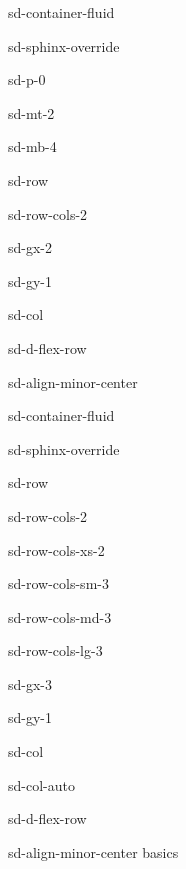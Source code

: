 \documentclass[letterpaper,10pt,english]{jupyterBook}
\begin{document}
\sphinxAtStartPar
{} 

\sphinxAtStartPar
{} 

\sphinxstepscope

\begin{sphinxuseclass}{sd-container-fluid}
\begin{sphinxuseclass}{sd-sphinx-override}
\begin{sphinxuseclass}{sd-p-0}
\begin{sphinxuseclass}{sd-mt-2}
\begin{sphinxuseclass}{sd-mb-4}
\begin{sphinxuseclass}{sd-row}
\begin{sphinxuseclass}{sd-row-cols-2}
\begin{sphinxuseclass}{sd-gx-2}
\begin{sphinxuseclass}{sd-gy-1}
\begin{sphinxuseclass}{sd-col}
\begin{sphinxuseclass}{sd-d-flex-row}
\begin{sphinxuseclass}{sd-align-minor-center}
\begin{sphinxuseclass}{sd-container-fluid}
\begin{sphinxuseclass}{sd-sphinx-override}
\begin{sphinxuseclass}{sd-row}
\begin{sphinxuseclass}{sd-row-cols-2}
\begin{sphinxuseclass}{sd-row-cols-xs-2}
\begin{sphinxuseclass}{sd-row-cols-sm-3}
\begin{sphinxuseclass}{sd-row-cols-md-3}
\begin{sphinxuseclass}{sd-row-cols-lg-3}
\begin{sphinxuseclass}{sd-gx-3}
\begin{sphinxuseclass}{sd-gy-1}
\begin{sphinxuseclass}{sd-col}
\begin{sphinxuseclass}{sd-col-auto}
\begin{sphinxuseclass}{sd-d-flex-row}
\begin{sphinxuseclass}{sd-align-minor-center}
\sphinxAtStartPar
basics


\end{sphinxuseclass}
\end{sphinxuseclass}
\end{sphinxuseclass}
\end{sphinxuseclass}
\end{sphinxuseclass}
\end{sphinxuseclass}
\end{sphinxuseclass}
\end{sphinxuseclass}
\end{sphinxuseclass}
\end{sphinxuseclass}
\end{sphinxuseclass}
\end{sphinxuseclass}
\end{sphinxuseclass}
\end{sphinxuseclass}
\end{sphinxuseclass}
\end{sphinxuseclass}
\end{sphinxuseclass}
\end{sphinxuseclass}
\end{sphinxuseclass}
\end{sphinxuseclass}
\end{sphinxuseclass}
\end{sphinxuseclass}
\end{sphinxuseclass}
\end{sphinxuseclass}
\end{sphinxuseclass}
\end{sphinxuseclass}
\end{document}
